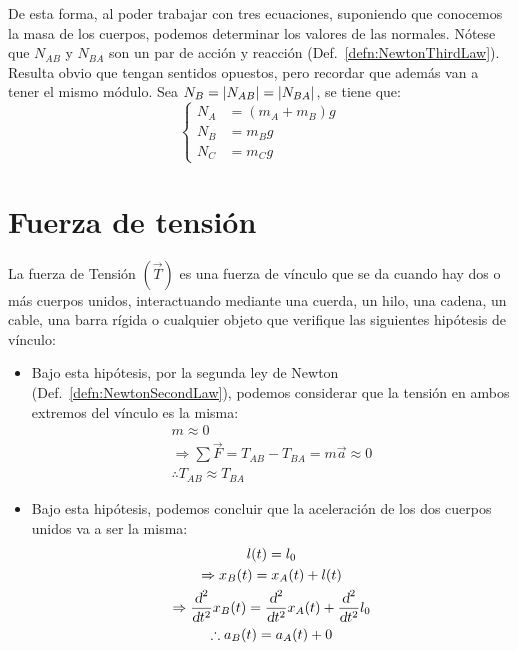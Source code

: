 \documentclass[a5paper,12pt,twoside]{book}
\begin{document}
\begin{mdframed}[style=MyFrame2]
    De esta forma, al poder trabajar con tres ecuaciones, suponiendo que conocemos la masa de los cuerpos, podemos determinar los valores de las normales. Nótese que $N_{AB}$ y $N_{BA}$ son un par de acción y reacción (Def.\ \ref{defn:NewtonThirdLaw}). Resulta obvio que tengan sentidos opuestos, pero recordar que además van a tener el mismo módulo. Sea $N_B = {\left| {N_{AB}} \right|} = {\left| {N_{BA}} \right|}$, se tiene que:
    \[
      \left\{
        \begin{aligned}
          N_A &= (m_A + m_B) g
          \\
          N_B &= m_B g
          \\
          N_C &= m_C g
        \end{aligned}
      \right.
    \]
\end{mdframed}


\section{Fuerza de tensión}

La fuerza de Tensión $(\Vec{T})$ es una fuerza de vínculo que se da cuando hay dos o más cuerpos unidos, interactuando mediante una cuerda, un hilo, una cadena, un cable, una barra rígida o cualquier objeto que verifique las siguientes hipótesis de vínculo:
\begin{itemize}
  \item {}

  Bajo esta hipótesis, por la segunda ley de Newton (Def.\ \ref{defn:NewtonSecondLaw}), podemos considerar que la tensión en ambos extremos del vínculo es la misma:
  \begin{gather*}
     m \approx 0
     \\
     \Rightarrow \sum \Vec{F} = T_{AB}-T_{BA} = m \Vec{a} \approx 0
     \\
     \therefore T_{AB} \approx T_{BA}
  \end{gather*}
  
  \item {}

  Bajo esta hipótesis, podemos concluir que la aceleración de los dos cuerpos unidos va a ser la misma:
  \begin{gather*}
    l(t) = l_0
    \\
    \Rightarrow x_B(t) = x_A(t) + l(t)
    \\
    \Rightarrow \dfrac{\textsl{d}^2}{\textsl{d} t^2} x_B(t) = \dfrac{\textsl{d}^2}{\textsl{d} t^2} x_A(t) + \dfrac{\textsl{d}^2}{\textsl{d} t^2} l_0
    \\
    \therefore a_B(t) = a_A(t) +0
  \end{gather*}
\end{itemize}
\end{document}
